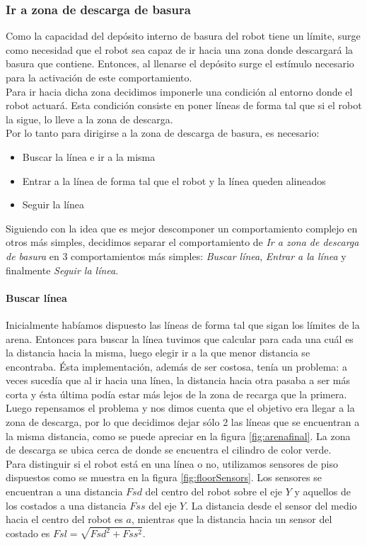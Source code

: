 \subsubsection{Ir a zona de descarga de basura}
\label{go_to_unload_zone}
Como la capacidad del dep\'osito interno de basura del robot tiene un l\'imite, 
surge como necesidad que el robot sea capaz de ir hacia una zona donde
descargar\'a la basura que contiene. Entonces, al llenarse el dep\'osito
surge el est\'imulo necesario para la activaci\'on de este comportamiento.
\\
Para ir hacia dicha zona decidimos imponerle una condici\'on al
entorno donde el robot actuar\'a. Esta condici\'on consiste en poner l\'ineas
de forma tal que si el robot la sigue, lo lleve a la zona de descarga.
\\
Por lo tanto para dirigirse a la zona de descarga de basura, es necesario:
\begin{itemize}
	\item Buscar la l\'inea e ir a la misma
	\item Entrar a la l\'inea de forma tal que el robot y la l\'inea queden
				alineados
	\item Seguir la l\'inea
\end{itemize}
Siguiendo con la idea que es mejor descomponer un comportamiento complejo en
otros m\'as simples, decidimos separar el comportamiento de \emph{Ir a zona de
descarga de basura} en 3 comportamientos m\'as simples: \emph{Buscar l\'inea},
\emph{Entrar a la l\'inea} y finalmente \emph{Seguir la l\'inea}.

\paragraph{Buscar l\'inea}
\label{find_line}
Inicialmente hab\'iamos dispuesto las l\'ineas de forma tal que sigan los
l\'imites de la arena. Entonces para buscar la l\'inea tuvimos que calcular
para cada una cu\'al es la distancia hacia la misma, luego elegir ir a la
que menor distancia se encontraba. \'Esta implementaci\'on, adem\'as de ser
costosa, ten\'ia un problema: a veces suced\'ia que al ir hacia una l\'inea,
la distancia hacia otra pasaba a ser m\'as corta y \'esta \'ultima pod\'ia
estar m\'as lejos de la zona de recarga que la primera.
\\
Luego repensamos el problema y nos dimos cuenta que el objetivo era llegar a la
zona de descarga, por lo que decidimos dejar s\'olo 2 las l\'ineas que se
encuentran a la misma distancia, como se puede apreciar en la figura
\ref{fig:arenafinal}. La zona de descarga se ubica cerca de donde se encuentra
el cilindro de color verde.
\\
Para distinguir si el robot est\'a en una l\'inea o no, utilizamos sensores de
piso dispuestos como se muestra en la figura \ref{fig:floorSensors}. Los
sensores se encuentran a una distancia $Fsd$ del centro del robot sobre el eje
$Y$ y aquellos de los costados a una distancia $Fss$ del eje $Y$. La distancia
desde el sensor del medio hacia el centro del robot es $a$, mientras que la
distancia hacia un sensor del costado es $Fsl = \sqrt{Fsd^2 + Fss^2}$.


